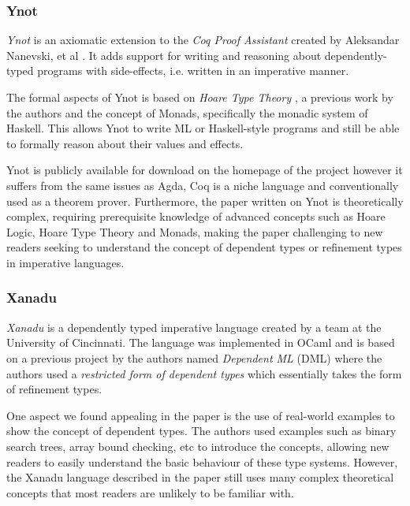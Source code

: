 \documentclass[a4paper,12pt]{report}
\begin{document}
\subsubsection{Ynot} \label{section:ynot}
\textit{Ynot} is an axiomatic extension to the \textit{Coq Proof Assistant} 
\cite{coq} created by Aleksandar Nanevski, et al \cite{ynot}. It adds 
support for writing and reasoning about dependently-typed 
programs with side-effects, i.e. written in an imperative manner. 

\par
The formal aspects of Ynot is based on \textit{Hoare Type Theory} \cite{htt}, 
a previous work by the authors and the concept of Monads, specifically 
the monadic system of Haskell. This allows Ynot to write 
ML or Haskell-style programs and still be able to formally 
reason about their values and effects.

\par
Ynot is publicly available for download on the homepage of the 
project \cite{theYnotProject} however it suffers from the same issues as 
Agda, Coq is a niche language and conventionally used as a theorem prover. 
Furthermore, the paper written on Ynot is theoretically complex, 
requiring prerequisite knowledge of advanced concepts such as Hoare 
Logic, Hoare Type Theory and Monads, making the paper challenging  
to new readers seeking to understand the concept of dependent types 
or refinement types in imperative languages. 

\subsubsection{Xanadu}
\textit{Xanadu} \cite{xanadu} is a dependently typed imperative language 
created by a team at the University of Cincinnati. The language was implemented 
in OCaml and is based on a previous project by the 
authors named \textit{Dependent ML} (DML) where the authors used a 
\textit{restricted form of dependent types} which essentially takes the 
form of refinement types.

\par
One aspect we found appealing in the paper is the use of real-world examples to 
show the concept of dependent types. The authors used examples such as binary 
search trees, array bound checking, etc to introduce the concepts, allowing new 
readers to easily understand the basic behaviour of these 
type systems. However, the Xanadu language described in the paper still uses many 
complex theoretical concepts that most readers are unlikely to be familiar with. 
\end{document}
